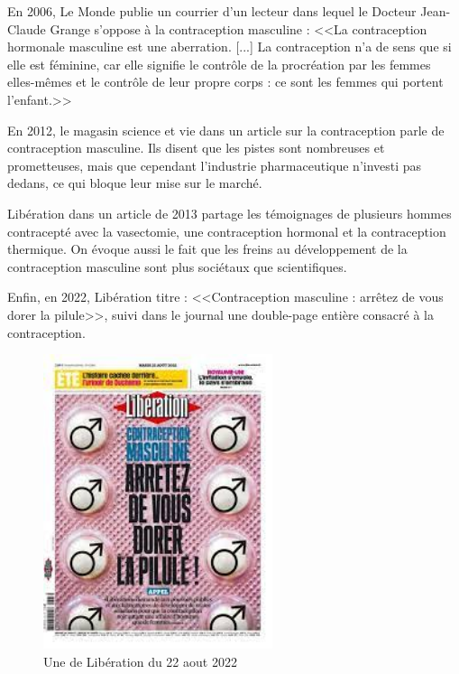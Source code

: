 \documentclass[12pt,a4paper]{report}
\begin{document}
En 2006, Le Monde publie un courrier d'un lecteur dans lequel le Docteur Jean-Claude Grange s'oppose à la contraception masculine : <<La contraception hormonale masculine est une aberration. [...] La contraception n'a de sens que si elle est féminine, car elle signifie le contrôle de la procréation par les femmes elles-mêmes et le contrôle de leur propre corps : ce sont les femmes qui portent l'enfant.>> \cite{josephTravailleusesSexe2006}

En 2012, le magasin science et vie dans un article sur la contraception parle de contraception masculine. Ils disent que les pistes sont nombreuses et prometteuses, mais que cependant l'industrie pharmaceutique n'investi pas dedans, ce qui bloque leur mise sur le marché. \cite{bettayebRecherchePrometEnfin2012}

Libération dans un article de 2013 partage les témoignages de plusieurs hommes contracepté avec la vasectomie, une contraception hormonal et la contraception thermique. On évoque aussi le fait que les freins au développement de la contraception masculine sont plus sociétaux que scientifiques. \cite{genthialonContraceptionPasseMale2013}

Enfin, en 2022, Libération titre : <<Contraception masculine : arrêtez de vous dorer la pilule>>, suivi dans le journal une double-page entière consacré à la contraception.\cite{ContraceptionMasculineScience}

\begin{figure}[H]
    \centering
    \includegraphics[width=0.6\textwidth]{images/questionnaire/Une_libe.png}
    \caption{Une de Libération du 22 aout 2022}
    \label{fig:libertion}
\end{figure}
\end{document}
